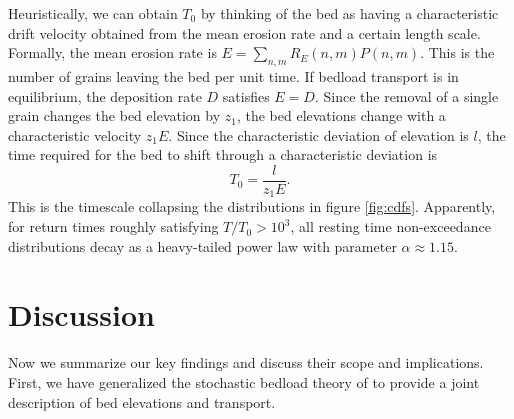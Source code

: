 \documentclass[draft]{agujournal2018}
\newcommand\be{\begin{equation}} %
\newcommand\ee{\end{equation}}   %
\begin{document}
Heuristically, we can obtain $T_0$ by thinking of the bed as having a characteristic drift velocity obtained from the mean erosion rate and a certain length scale.
Formally, the mean erosion rate is $E = \sum_{n,m}R_E(n,m)P(n,m)$.
This is the number of grains leaving the bed per unit time.
If bedload transport is in equilibrium, the deposition rate $D$ satisfies $E=D$.
Since the removal of a single grain changes the bed elevation by $z_1$, 
the bed elevations change with a characteristic velocity $z_1 E$.
Since the characteristic deviation of elevation is $l$, the time required for the bed to shift through a characteristic deviation is
\be T_0 = \frac{l}{z_1 E}.\label{eq:time}\ee
This is the timescale collapsing the distributions in figure \ref{fig:cdfs}.
Apparently, for return times roughly satisfying $T/T_0 > 10^3$, all resting time non-exceedance distributions decay as a heavy-tailed power law with parameter $\alpha \approx 1.15$.

\section{Discussion}

Now we summarize our key findings and discuss their scope and implications.
First, we have generalized the stochastic bedload theory of \citet{Ancey2008} to provide a joint description of bed elevations and transport.
\end{document}
